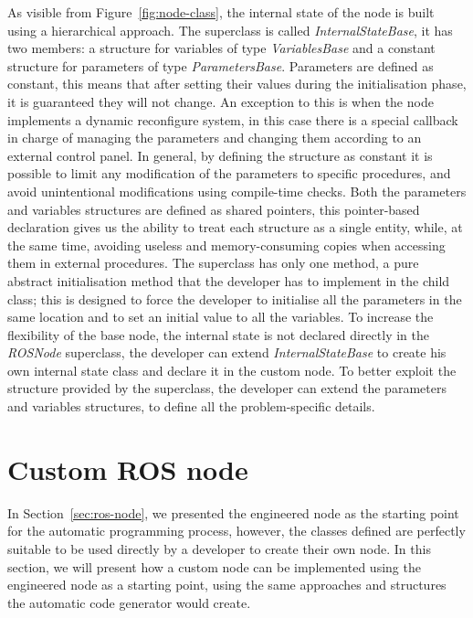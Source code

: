 As visible from Figure~\ref{fig:node-class}, the internal state of the node is built using a hierarchical approach. The superclass is called \textit{InternalStateBase}, it has two members: a structure for variables of type \textit{VariablesBase} and a constant structure for parameters of type  \textit{ParametersBase}. Parameters are defined as constant, this means that after setting their values during the initialisation phase, it is guaranteed they will not change. An exception to this is when the node implements a dynamic reconfigure system, in this case there is a special callback in charge of managing the parameters and changing them according to an external control panel. In general, by defining the structure as constant it is possible to limit any modification of the parameters to specific procedures, and avoid unintentional modifications using compile-time checks. Both the parameters and variables structures are defined as shared pointers, this pointer-based declaration gives us the ability to treat each structure as a single entity, while, at the same time, avoiding useless and memory-consuming copies when accessing them in external procedures. The superclass has only one method, a pure abstract initialisation method that the developer has to implement in the child class; this is designed to force the developer to initialise all the parameters in the same location and to set an initial value to all the variables. To increase the flexibility of the base node, the internal state is not declared directly in the \textit{ROSNode} superclass, the developer can extend \textit{InternalStateBase} to create his own internal state class and declare it in the custom node. To better exploit the structure provided by the superclass, the developer can extend the parameters and variables structures, to define all the problem-specific details.

\section{Custom ROS node}
In Section~\ref{sec:ros-node}, we presented the engineered node as the starting point for the automatic programming process, however, the classes defined are perfectly suitable to be used directly by a developer to create their own node. In this section, we will present how a custom node can be implemented using the engineered node as a starting point, using the same approaches and structures the automatic code generator would create.

